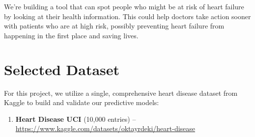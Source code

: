 \documentclass[11pt,a4paper]{article}
\begin{document}
We're building a tool that can spot
people who might be at risk of heart failure by
looking at their health information.
This could help doctors take action sooner
with patients who are at high risk, possibly
preventing heart failure from happening in the first
place and saving lives.

\section{Selected Dataset}

\begin{tcolorbox}[notebox={Dataset Information}]
    For this project, we utilize a single, comprehensive heart disease dataset from Kaggle to build and validate our predictive models:
    \vspace{-0.25cm}
    \begin{enumerate}[leftmargin=*, itemsep=2pt, parsep=0pt]
        \item \textbf{Heart Disease UCI} (10,000 entries) –
              \url{https://www.kaggle.com/datasets/oktayrdeki/heart-disease}
    \end{enumerate}
\end{tcolorbox}
\end{document}
